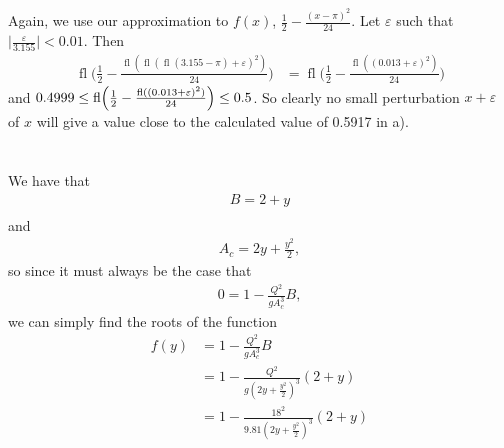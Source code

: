 \documentclass[11pt]{article}
\DeclareMathOperator{\fl}{fl}
\begin{document}
\subsection{} %
Again, we use our approximation to $f(x)$, $\frac{1}{2}-\frac{(x-\pi)^2}{24}$.
Let $\varepsilon$ such that $\vert\frac{\varepsilon}{3.155}\vert<0.01$. Then
\begin{align*}
	\fl\Biggl(\frac{1}{2}-\frac{\fl(\fl(\fl(3.155-\pi)+\varepsilon)^2)}{24}\Biggr)
	&=\fl\Biggl(\frac{1}{2}-\frac{\fl((0.013+\varepsilon)^2)}{24}\Biggr)
\end{align*}
and $0.4999\le\fl\Bigl(\frac{1}{2}-\frac{\fl((0.013+\varepsilon)^2)}{24}\Bigr)\le0.5$.
So clearly no small perturbation $x+\varepsilon$ of $x$ will give a value close
to the calculated value of 0.5917 in a).


\section{} %
\subsection{} %



\subsection{} %
We have that
\begin{align*}
	B=2+y\\
\end{align*}
	and
\begin{align*}
	A_c=2y+\frac{y^2}{2},
\end{align*}
so since it must always be the case that
\begin{align*}
	0=1-\frac{Q^2}{gA_c^3}B,
\end{align*}
we can simply find the roots of the function
\begin{align*}
	f(y)&=1-\frac{Q^2}{gA_c^3}B\\
	&=1-\frac{Q^2}{g(2y+\frac{y^2}{2})^3}(2+y)\\
	&=1-\frac{18^2}{9.81(2y+\frac{y^2}{2})^3}(2+y)
\end{align*}
\end{document}

